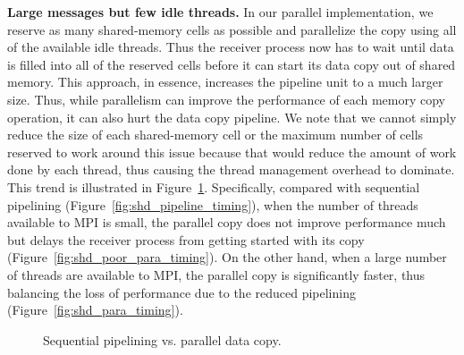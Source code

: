 \vspace{1.0ex}
\noindent\textbf{Large messages but few idle threads.}  In our
parallel implementation, we reserve as many shared-memory cells as
possible and parallelize the copy using all of the available idle
threads.  Thus the receiver process now has to wait until data is
filled into all of the reserved cells before it can start its data
copy out of shared memory.  This approach, in essence, increases the
pipeline unit to a much larger size.  Thus, while parallelism can
improve the performance of each memory copy operation, it can also
hurt the data copy pipeline.  We note that we cannot simply reduce the
size of each shared-memory cell or the maximum number of cells
reserved to work around this issue because that would reduce the
amount of work done by each thread, thus causing the thread management
overhead to dominate.  This trend is illustrated in
Figure~\ref{fig:shd_timing}.  Specifically, compared with sequential
pipelining (Figure~\ref{fig:shd_pipeline_timing}), when the number of
threads available to MPI is small, the parallel copy does not improve
performance much but delays the receiver process from getting started
with its copy (Figure~\ref{fig:shd_poor_para_timing}).  On the other
hand, when a large number of threads are available to MPI, the parallel
copy is significantly faster, thus balancing the loss of performance
due to the reduced pipelining (Figure~\ref{fig:shd_para_timing}).

\begin{figure}
  \vspace{-2.0ex}
  \caption{Sequential pipelining vs. parallel data copy.}
  \vspace{-3.0ex}
  \label{fig:shd_timing}
\end{figure}

